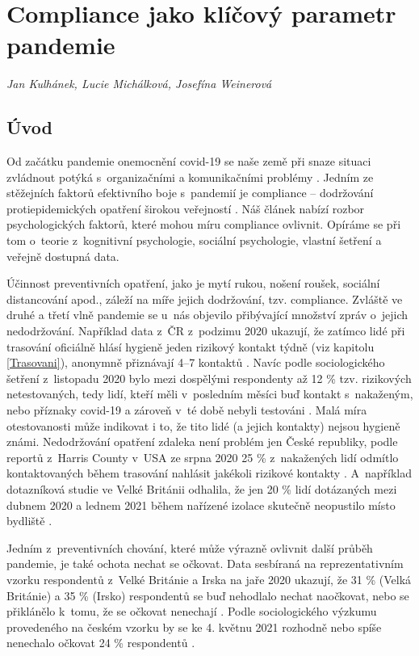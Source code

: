 \chapter{Compliance jako klíčový parametr pandemie}
\label{Compliance}

\textit{Jan Kulhánek, Lucie Michálková, Josefína Weinerová}
\vspace{15mm}

\section*{Úvod} 

Od začátku pandemie onemocnění covid-19 se naše země při snaze situaci zvládnout potýká s~organizačními a komunikačními problémy \cite{CeskaTiskovaKancelar2020,Vlckova2020}. Jedním ze stěžejních faktorů efektivního boje s~pandemií je compliance -- dodržování protiepidemických opatření širokou veřejností \cite{VanRooij2020}. Náš článek nabízí rozbor psychologických faktorů, které mohou míru compliance ovlivnit. Opíráme se při tom o~teorie z~kognitivní psychologie, sociální psychologie, vlastní šetření a veřejně dostupná data. 

Účinnost preventivních opatření, jako je mytí rukou, nošení roušek, sociální distancování apod., záleží na míře jejich dodržování, tzv. compliance. Zvláště ve druhé a třetí vlně pandemie se u~nás objevilo přibývající množství zpráv o~jejich nedodržování. Například data z~ČR z~podzimu 2020 ukazují, že zatímco lidé při trasování oficiálně hlásí hygieně jeden rizikový kontakt týdně (viz kapitolu \ref{Trasovani}), anonymně přiznávají 4--7 kontaktů \cite{tr_PAQ01}. Navíc podle sociologického šetření  z~listopadu 2020 bylo mezi dospělými respondenty až 12 \% tzv. rizikových netestovaných, tedy lidí, kteří měli v~posledním měsíci buď kontakt s~nakaženým, nebo příznaky covid-19 a zároveň v~té době nebyli testováni \cite{Prokop2020a}. Malá míra otestovanosti může indikovat i to, že tito lidé (a jejich kontakty) nejsou hygieně známi. Nedodržování opatření zdaleka není problém jen České republiky, podle reportů z~Harris County v~USA ze srpna 2020 25 \% z~nakažených lidí odmítlo kontaktovaných během trasování nahlásit jakékoli rizikové kontakty \cite{Shapiro2020}. A~například dotazníková studie ve Velké Británii odhalila, že jen 20 \% lidí dotázaných mezi dubnem 2020 a lednem 2021 během nařízené izolace skutečně neopustilo místo bydliště \cite{Smith2021}.

Jedním z~preventivních chování, které může výrazně ovlivnit další průběh pandemie, je také ochota nechat se očkovat. Data sesbíraná na reprezentativním vzorku respondentů z~Velké Británie a Irska na jaře 2020 ukazují, že 31 \% (Velká Británie) a 35 \% (Irsko) respondentů se buď nehodlalo nechat naočkovat, nebo se přiklánělo k~tomu, že se očkovat nenechají \cite{Murphy2021}. Podle sociologického výzkumu  provedeného na českém vzorku by se ke 4. květnu 2021 rozhodně nebo spíše nenechalo očkovat 24 \% respondentů \cite{Prokop2021}.

